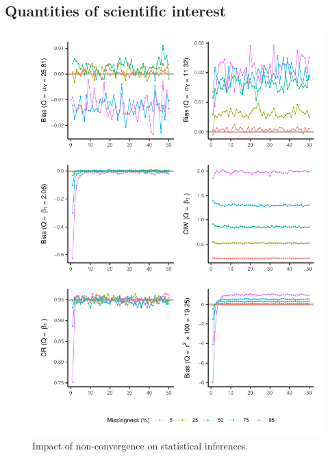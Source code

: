\documentclass[Royal,times,sageh]{sagej}
\begin{document}
\hypertarget{quantities-of-scientific-interest}{%
\subsection{Quantities of scientific interest}\label{quantities-of-scientific-interest}}

\begin{figure}

{\centering \includegraphics{2.Manuscript_files/figure-latex/Qs-1} 

}

\caption{Impact of non-convergence on statistical inferences.}\label{fig:Qs}
\end{figure}
\end{document}
